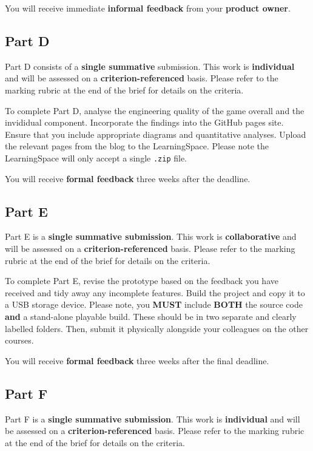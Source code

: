 \documentclass{../../fal_assignment}
\begin{document}
You will receive immediate \textbf{informal feedback} from your \textbf{product owner}.

\subsection*{Part D}

Part D consists of a \textbf{single summative} submission. This work is \textbf{individual} and will be assessed on a \textbf{criterion-referenced} basis. Please refer to the marking rubric at the end of the brief for details on the criteria.

To complete Part D, analyse the engineering quality of the game overall and the invididual component. Incorporate the findings into the GitHub pages site. Ensure that you include appropriate diagrams and quantitative analyses. Upload the relevant pages from the blog to the LearningSpace. Please note the LearningSpace will only accept a single \texttt{.zip} file. 

You will receive \textbf{formal feedback} three weeks after the deadline.

\subsection*{Part E}

Part E is a \textbf{single summative submission}. This work is \textbf{collaborative} and will be assessed on a \textbf{criterion-referenced} basis. Please refer to the marking rubric at the end of the brief for details on the criteria.

To complete Part E, revise the prototype based on the  feedback you have received and tidy away any incomplete features. Build the project and copy it to a USB storage device. Please note, you \textbf{MUST} include \textbf{BOTH} the source code \textbf{and} a stand-alone playable build. These should be in two separate and clearly labelled folders. Then, submit it physically alongside your colleagues on the other courses.

You will receive \textbf{formal feedback} three weeks after the final deadline.

\subsection*{Part F}

Part F is a \textbf{single summative submission}. This work is \textbf{individual} and will be assessed on a \textbf{criterion-referenced} basis. Please refer to the marking rubric at the end of the brief for details on the criteria.
\end{document}
